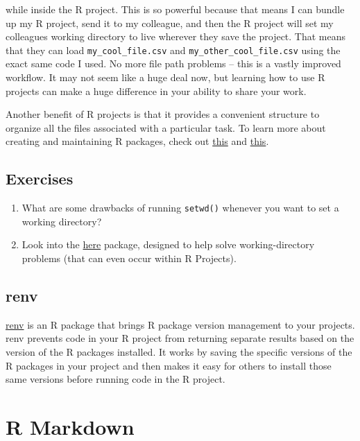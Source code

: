 \documentclass[
]{book}
\begin{document}
while inside the R project. This is so powerful because that means I can bundle up my R project, send it to my colleague, and then the R project will set my colleagues working directory to live wherever they save the project. That means that they can load \texttt{my\_cool\_file.csv} and \texttt{my\_other\_cool\_file.csv} using the exact same code I used. No more file path problems -- this is a vastly improved workflow. It may not seem like a huge deal now, but learning how to use R projects can make a huge difference in your ability to share your work.

Another benefit of R projects is that it provides a convenient structure to organize all the files associated with a particular task. To learn more about creating and maintaining R packages, check out \href{https://r4ds.had.co.nz/workflow-projects.html}{this} and \href{https://support.rstudio.com/hc/en-us/articles/200526207-Using-Projects}{this}.

\hypertarget{ex-set11}{%
\subsection{Exercises}\label{ex-set11}}

\begin{enumerate}
\def\labelenumi{\arabic{enumi}.}
\item
  What are some drawbacks of running \texttt{setwd()} whenever you want to set a working directory?
\item
  Look into the \href{https://here.r-lib.org/}{here} package, designed to help solve working-directory problems (that can even occur within R Projects).
\end{enumerate}

\hypertarget{renv}{%
\subsection{renv}\label{renv}}

\href{https://rstudio.github.io/renv/articles/renv.html}{renv} is an R package that brings R package version management to your projects. renv prevents code in your R project from returning separate results based on the version of the R packages installed. It works by saving the specific versions of the R packages in your project and then makes it easy for others to install those same versions before running code in the R project.

\hypertarget{rmarkdown}{%
\section{R Markdown}\label{rmarkdown}}
\end{document}
